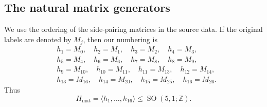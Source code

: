 \subsection{The natural matrix generators}

We use the ordering of the side-pairing matrices in the source data.  If the
original labels are denoted by $M_j$, then our numbering is
\[
\begin{aligned}
&h_{1}=M_{0},\quad h_{2}=M_{1},\quad h_{3}=M_{2},\quad h_{4}=M_{3}, \\
&h_{5}=M_{4},\quad h_{6}=M_{6},\quad h_{7}=M_{8},\quad h_{8}=M_{9}, \\
&h_{9}=M_{10},\quad h_{10}=M_{11},\quad h_{11}=M_{13},\quad h_{12}=M_{14}, \\
&h_{13}=M_{16},\quad h_{14}=M_{20},\quad h_{15}=M_{25},\quad h_{16}=M_{26}.
\end{aligned}
\]
Thus
\[
H_{\mathrm{mat}}=\langle h_1,\ldots,h_{16}\rangle
\leq \operatorname{SO}(5,1;\mathbb Z).
\]

